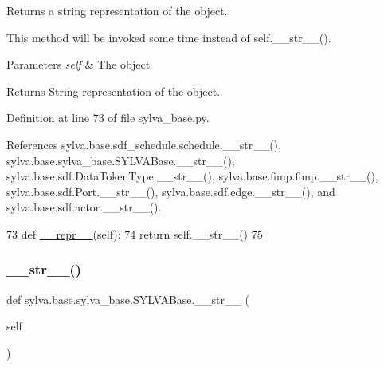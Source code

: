 Returns a string representation of the object. 

This method will be invoked some time instead of self.\+\_\+\+\_\+str\+\_\+\+\_\+().


\begin{DoxyParams}{Parameters}
{\em self} & The object\\
\hline
\end{DoxyParams}
\begin{DoxyReturn}{Returns}
String representation of the object. 
\end{DoxyReturn}


Definition at line 73 of file sylva\+\_\+base.\+py.



References sylva.\+base.\+sdf\+\_\+schedule.\+schedule.\+\_\+\+\_\+str\+\_\+\+\_\+(), sylva.\+base.\+sylva\+\_\+base.\+S\+Y\+L\+V\+A\+Base.\+\_\+\+\_\+str\+\_\+\+\_\+(), sylva.\+base.\+sdf.\+Data\+Token\+Type.\+\_\+\+\_\+str\+\_\+\+\_\+(), sylva.\+base.\+fimp.\+fimp.\+\_\+\+\_\+str\+\_\+\+\_\+(), sylva.\+base.\+sdf.\+Port.\+\_\+\+\_\+str\+\_\+\+\_\+(), sylva.\+base.\+sdf.\+edge.\+\_\+\+\_\+str\+\_\+\+\_\+(), and sylva.\+base.\+sdf.\+actor.\+\_\+\+\_\+str\+\_\+\+\_\+().


\begin{DoxyCode}
73     \textcolor{keyword}{def }\hyperlink{namespacesylva_1_1code__generation_1_1floorplanner_a84f24b1e40f5425e9bb40ab45ccbd10f}{\_\_repr\_\_}(self):
74         \textcolor{keywordflow}{return} self.\_\_str\_\_()
75 
\end{DoxyCode}
\mbox{\label{classsylva_1_1base_1_1sylva__base_1_1_s_y_l_v_a_base_a6c1ed8e83c61ea8a6035b5e4460989f3}} 
\subsubsection{\texorpdfstring{\+\_\+\+\_\+str\+\_\+\+\_\+()}{\_\_str\_\_()}}
{\footnotesize\ttfamily def sylva.\+base.\+sylva\+\_\+base.\+S\+Y\+L\+V\+A\+Base.\+\_\+\+\_\+str\+\_\+\+\_\+ (\begin{DoxyParamCaption}\item[{}]{self }\end{DoxyParamCaption})}



